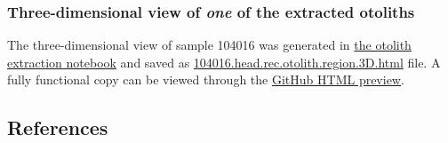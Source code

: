 \hypertarget{three-dimensional-view-of-one-of-the-extracted-otoliths}{%
\subsubsection{\texorpdfstring{Three-dimensional view of \emph{one} of the extracted otoliths}{Three-dimensional view of one of the extracted otoliths}}\label{three-dimensional-view-of-one-of-the-extracted-otoliths}}

The three-dimensional view of sample 104016 was generated in \href{https://github.com/habi/EAWAG/blob/master/ExtractOtoliths.ipynb}{the otolith extraction notebook} and saved as \href{https://github.com/habi/EAWAG-manuscript/blob/main/content/data/104016.head.rec.otolith.region.3D.html}{104016.head.rec.otolith.region.3D.html} file.
A fully functional copy can be viewed through the \href{https://htmlpreview.github.io/?https://github.com/habi/EAWAG-manuscript/blob/main/content/data/104016.head.rec.otolith.region.3D.html}{GitHub HTML preview}.

\hypertarget{references}{%
\subsection{References}\label{references}}

